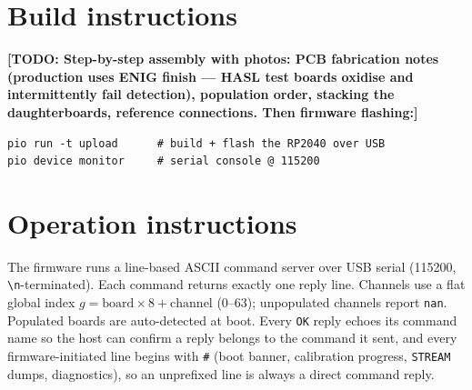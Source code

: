 \documentclass[11pt]{article}
\newif\ifdraft\drafttrue
\newcommand{\todo}[1]{\ifdraft{\color{red}\textbf{[TODO: #1]}}\fi}
\begin{document}

\section{Build instructions}
\label{sec:build}
\todo{Step-by-step assembly with photos: PCB fabrication notes (production uses
ENIG finish --- HASL test boards oxidise and intermittently fail detection),
population order, stacking the daughterboards, reference connections. Then
firmware flashing:}
\begin{verbatim}
pio run -t upload      # build + flash the RP2040 over USB
pio device monitor     # serial console @ 115200
\end{verbatim}

\section{Operation instructions}
\label{sec:operation}

The firmware runs a line-based ASCII command server over USB serial (115200,
\texttt{\textbackslash n}-terminated). Each command returns exactly one reply
line. Channels use a flat global index $g = \text{board}\times 8 +
\text{channel}$ (0--63); unpopulated channels report \texttt{nan}. Populated
boards are auto-detected at boot. Every \texttt{OK} reply echoes its command
name so the host can confirm a reply belongs to the command it sent, and every
firmware-initiated line begins with \texttt{\#} (boot banner, calibration
progress, \texttt{STREAM} dumps, diagnostics), so an unprefixed line is always a
direct command reply.
\end{document}
